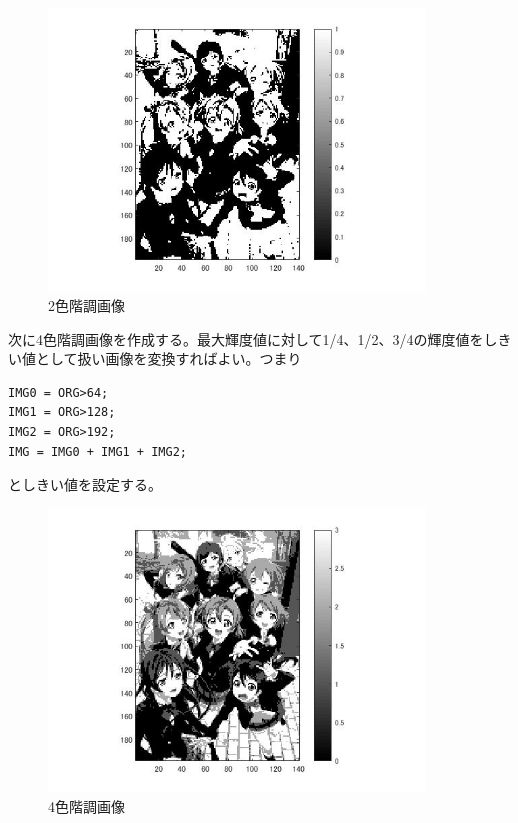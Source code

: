 \documentclass{jsarticle}
\begin{document}
\begin{figure}[htbp]
 \begin{center}
  \includegraphics[width=10cm]{kadai2-1.jpg}
 \end{center}
 \caption{2色階調画像}
\end{figure}

次に4色階調画像を作成する。最大輝度値に対して1/4、1/2、3/4の輝度値をしきい値として扱い画像を変換すればよい。つまり
\begin{lstlisting}[basicstyle=\ttfamily\footnotesize, frame=single]
IMG0 = ORG>64;
IMG1 = ORG>128;
IMG2 = ORG>192;
IMG = IMG0 + IMG1 + IMG2;
\end{lstlisting}
としきい値を設定する。

\newpage

\begin{figure}[htbp]
 \begin{center}
  \includegraphics[width=10cm]{kadai2-2.jpg}
 \end{center}
 \caption{4色階調画像}
\end{figure}
\end{document}
